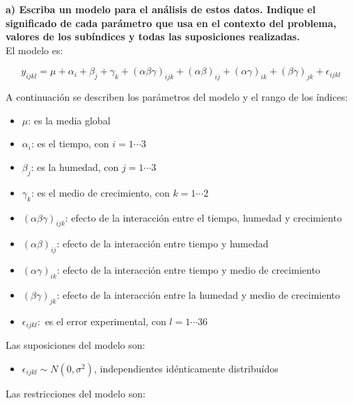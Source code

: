 \documentclass[11pt]{article}
\providecommand{\tightlist}{%
      \setlength{\itemsep}{0pt}\setlength{\parskip}{0pt}}
\begin{document}
    \textbf{a) Escriba un modelo para el análisis de estos datos. Indique el significado de cada parámetro que usa en el contexto del problema,
valores de los subíndices y todas las suposiciones realizadas.}\\

El modelo es:

\[y_{ijkl} = \mu + \alpha_i + \beta_j + \gamma_k + (\alpha \beta \gamma)_{ijk} + (\alpha \beta)_{ij} + (\alpha \gamma)_{ik} + (\beta \gamma)_{jk} + \epsilon_{ijkl}\]

A continuación se describen los parámetros del modelo y el rango de los
índices:

\begin{itemize}
\tightlist
\item
  \(\mu\): es la media global
\item
  \(\alpha_i\): es el tiempo, con \(i = 1 \cdots 3\)
\item
  \(\beta_j\): es la humedad, con \(j = 1 \cdots 3\)
\item
  \(\gamma_k\): es el medio de crecimiento, con \(k = 1 \cdots 2\)
\item
  \((\alpha \beta \gamma)_{ijk}\): efecto de la interacción entre el
  tiempo, humedad y crecimiento
\item
  \((\alpha \beta)_{ij}\): efecto de la interacción entre tiempo y
  humedad
\item
  \((\alpha \gamma)_{ik}\): efecto de la interacción entre tiempo y
  medio de crecimiento
\item
  \((\beta \gamma)_{jk}\): efecto de la interacción entre la humedad y
  medio de crecimiento
\item
  \(\epsilon_{ijkl}:\) es el error experimental, con \(l=1 \cdots 36\)
\end{itemize}

    Las suposiciones del modelo son:

\begin{itemize}
\tightlist
\item
  \(\epsilon_{ijkl} \sim N(0, \sigma^2)\), independientes idénticamente
  distribuídos
\end{itemize}

Las restricciones del modelo son:
\end{document}
